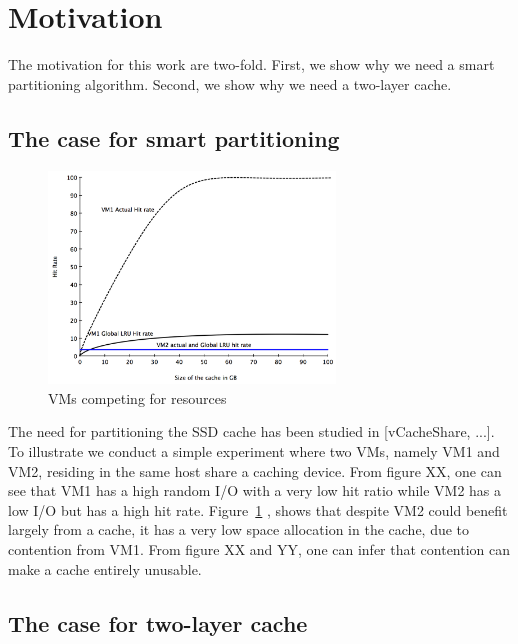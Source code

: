 
\section{Motivation}
The motivation for this work are two-fold. First, we show why we need a smart partitioning algorithm. Second, we show why we need a two-layer cache.

\subsection{The case for smart partitioning}

\begin{figure}[tb]
\setlength{\belowcaptionskip}{-15pt}
\centering
\includegraphics[width=3in]{figures/hitrate_fake}
\caption{VMs competing for resources}
\label{fig:compete}
\end{figure}

The need for partitioning the SSD cache has been studied in [vCacheShare, ...]. To illustrate we conduct a simple experiment where two VMs, namely VM1 and VM2, residing in the same host share a caching device. From figure XX, one can see that VM1 has a high random I/O with a very low hit ratio while VM2 has a low I/O but has a high hit rate. Figure~\ref{fig:compete} , shows that despite VM2 could benefit largely from a cache, it has a very low space allocation in the cache, due to contention from VM1. From figure XX and YY, one can infer that contention can make a cache entirely unusable.



\subsection{The case for two-layer cache}


